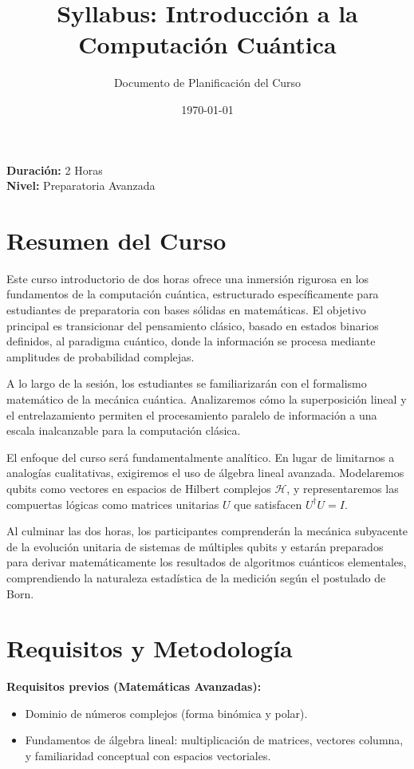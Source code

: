 \documentclass[12pt, a4paper]{article}
\title{\textbf{Syllabus: Introducción a la Computación Cuántica}}
\author{Documento de Planificación del Curso}
\date{\today}
\begin{document}
\maketitle

\noindent\textbf{Duración:} 2 Horas \\
\textbf{Nivel:} Preparatoria Avanzada

\section*{Resumen del Curso}
Este curso introductorio de dos horas ofrece una inmersión rigurosa en los fundamentos de la computación cuántica, estructurado específicamente para estudiantes de preparatoria con bases sólidas en matemáticas. El objetivo principal es transicionar del pensamiento clásico, basado en estados binarios definidos, al paradigma cuántico, donde la información se procesa mediante amplitudes de probabilidad complejas.

A lo largo de la sesión, los estudiantes se familiarizarán con el formalismo matemático de la mecánica cuántica. Analizaremos cómo la superposición lineal y el entrelazamiento permiten el procesamiento paralelo de información a una escala inalcanzable para la computación clásica.

El enfoque del curso será fundamentalmente analítico. En lugar de limitarnos a analogías cualitativas, exigiremos el uso de álgebra lineal avanzada. Modelaremos qubits como vectores en espacios de Hilbert complejos $\mathcal{H}$, y representaremos las compuertas lógicas como matrices unitarias $U$ que satisfacen $U^\dagger U = I$. 

Al culminar las dos horas, los participantes comprenderán la mecánica subyacente de la evolución unitaria de sistemas de múltiples qubits y estarán preparados para derivar matemáticamente los resultados de algoritmos cuánticos elementales, comprendiendo la naturaleza estadística de la medición según el postulado de Born.

\section*{Requisitos y Metodología}

\textbf{Requisitos previos (Matemáticas Avanzadas):}
\begin{itemize}
    \item Dominio de números complejos (forma binómica y polar).
    \item Fundamentos de álgebra lineal: multiplicación de matrices, vectores columna, y familiaridad conceptual con espacios vectoriales.
\end{itemize}
\end{document}
